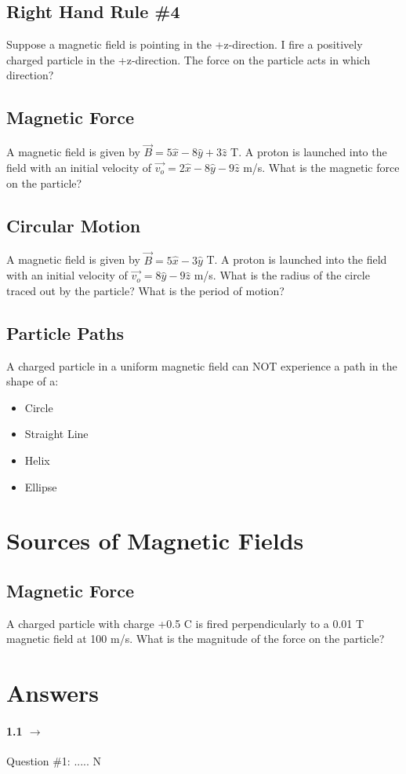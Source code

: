 \documentclass[12pt]{article}
\begin{document}
\subsection{Right Hand Rule \#4}
Suppose a magnetic field is pointing in the +z-direction.  I fire a positively charged particle in the +z-direction.  The force on the particle acts in which direction?

\subsection{Magnetic Force}
A magnetic field is given by $\vec{B} = 5 \hat{x} - 8\hat{y} + 3\hat{z}$ T.  A proton is launched into the field with an initial velocity of $\vec{v_o} = 2\hat{x} - 8\hat{y} - 9\hat{z}$ m/s.  What is the magnetic force on the particle?

\subsection{Circular Motion}
A magnetic field is given by $\vec{B} = 5 \hat{x} - 3\hat{y}$ T.  A proton is launched into the field with an initial velocity of $\vec{v_o} = 8\hat{y} - 9\hat{z}$ m/s.  What is the radius of the circle traced out by the particle?  What is the period of motion?

\subsection{Particle Paths}
A charged particle in a uniform magnetic field can NOT experience a path in the shape of a:

\begin{itemize}
	\item Circle
	\item Straight Line
	\item Helix
	\item Ellipse
\end{itemize}


\pagebreak
\section{Sources of Magnetic Fields}

\subsection{Magnetic Force}
A charged particle with charge +0.5 C is fired perpendicularly to a 0.01 T magnetic field at 100 m/s.  What is the magnitude of the force on the particle?


\pagebreak
\section{Answers}

\paragraph{1.1 $\rightarrow$} Question \#1: ..... N
\end{document}
